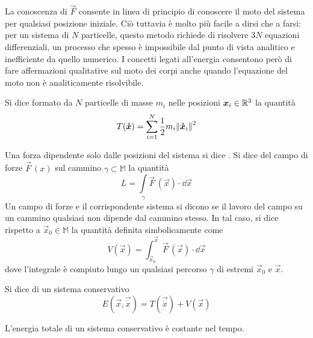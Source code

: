 La conoscenza di $\vec{F}$ consente in linea di principio di conoscere il moto del sistema per qualsiasi posizione iniziale. Ciò tuttavia è molto più facile a dirsi che a farsi: per un sistema di $N$ particelle, questo metodo richiede di risolvere $3N$ equazioni differenziali, un processo che spesso è impossibile dal punto di vista analitico e inefficiente da quello numerico. I concetti legati all'energia consentono però di fare affermazioni qualitative sul moto dei corpi anche quando l'equazione del moto non è analiticamente risolvibile.
\begin{definition}
  Si dice  formato da $N$ particelle di masse $m_i$ nelle posizioni $\boldsymbol{x}_i \in \mathbb{R}^3$ la quantità \begin{equation}
    T(\boldsymbol{\dot{x}}) = \sum_{i=1}^{N} \frac{1}{2}m_i\norm{\boldsymbol{\dot{x}}_i}^2
  \end{equation} 
\end{definition}
\begin{definition}
  Una forza dipendente solo dalle posizioni del sistema si dice . Si dice  del campo di forze $\vec{F}\, (x)$ sul cammino $\gamma \subset \mathbb{M}$ la quantità \begin{equation}
  L = \int\limits_{\gamma} \vec{F}\,(\vec{x})\cdot \dd \vec{x}
  \end{equation} 
  Un campo di forze e il corrispondente sistema si dicono  se il lavoro del campo su un cammino qualsiasi non dipende dal cammino stesso. In tal caso, si dice  rispetto a $\vec{x}_0 \in \mathbb{M}$ la quantità definita simbolicamente come \begin{equation}
  V(\vec{x}) = \int_{\vec{x}_0}^{\vec{x}} \vec{F}\,(\vec{x})\cdot \dd \vec{x}
  \end{equation} 
  dove l'integrale è compiuto lungo un qualsiasi percorso $\gamma$ di estremi $\vec{x}_0$ e $\vec{x}$.
\end{definition}
\begin{definition}
  Si dice  di un sistema conservativo\begin{equation}
  E(\vec{x},\vec{\dot{x}}) = T(\vec{\dot{x}}) + V(\vec{x})
  \end{equation} 
\end{definition}
\begin{theorem} \label{thm:energyCons}
L'energia totale di un sistema conservativo è costante nel tempo.
\end{theorem}

